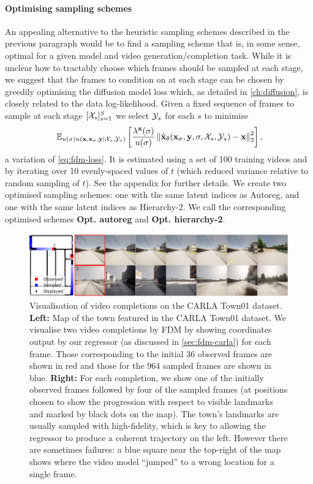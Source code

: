 \paragraph{Optimising sampling schemes}
An appealing alternative to the heuristic sampling schemes described in the previous paragraph would be to find a sampling scheme that is, in some sense, optimal for a given model and video generation/completion task. While it is unclear how to tractably choose which frames should be sampled at each stage, we suggest that the frames to condition on at each stage can be chosen by greedily optimising the diffusion model loss which, as detailed in \cref{ch:diffusion}, is closely related to the data log-likelihood. Given a fixed sequence of frames to sample at each stage $[\mathcal{X}_s]_{s=1}^S$ we select $\mathcal{Y}_s$ for each $s$ to minimise
\begin{align}
    \mathbb{E}_{u(\sigma)u({\mathbf{x}}, {\mathbf{x}}_\sigma, {\mathbf{y}}|{\mathcal{X}}_s, {\mathcal{Y}}_s)} \left[
    \frac{\lambda^{\mathbf{x}}(\sigma)}{u(\sigma)}
    \left\| \hat{{\mathbf{x}}}_\theta({\mathbf{x}}_\sigma, {\mathbf{y}}, \sigma, {\mathcal{X}}_s, {\mathcal{Y}}_s) - {\mathbf{x}} \right\|_2^2 \right],
\end{align}
a variation of \cref{eq:fdm-loss}. It is estimated using a set of 100 training videos and by iterating over 10 evenly-spaced values of $t$ (which reduced variance relative to random sampling of $t$). See the appendix for further details. We create two optimised sampling schemes: one with the same latent indices as Autoreg, and one with the same latent indices as Hierarchy-2. We call the corresponding optimised schemes \textbf{Opt. autoreg} and \textbf{Opt. hierarchy-2}.


\begin{figure}
    \centering
    \includegraphics[width=1\textwidth]{figs/fdm/carla_map_7panel}
    \caption{Visualisation of video completions on the CARLA Town01 dataset. \textbf{Left:} Map of the town featured in the CARLA Town01 dataset. We visualise two video completions by FDM by showing coordinates output by our regressor (as discussed in \cref{sec:fdm-carla}) for each frame. Those corresponding to the initial 36 observed frames are shown in red and those for the 964 sampled frames are shown in blue. \textbf{Right:} For each completion, we show one of the initially observed frames followed by four of the sampled frames (at positions chosen to show the progression with respect to visible landmarks and marked by black dots on the map). The town's landmarks are usually sampled with high-fidelity, which is key to allowing the regressor  to produce a coherent trajectory on the left. However there are sometimes failures: a blue square near the top-right of the map shows where the video model ``jumped'' to a wrong location for a single frame.}
    \label{fig:carla}
\end{figure}


